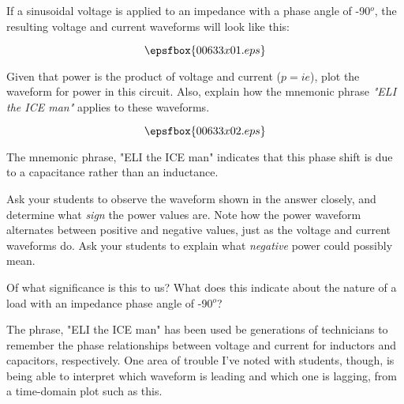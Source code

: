

If a sinusoidal voltage is applied to an impedance with a phase angle of -90$^{o}$, the resulting voltage and current waveforms will look like this:

$$\epsfbox{00633x01.eps}$$

Given that power is the product of voltage and current ($p = i e$), plot the waveform for power in this circuit.  Also, explain how the mnemonic phrase {\it "ELI the ICE man"} applies to these waveforms.







$$\epsfbox{00633x02.eps}$$

The mnemonic phrase, "ELI the ICE man" indicates that this phase shift is due to a capacitance rather than an inductance.







Ask your students to observe the waveform shown in the answer closely, and determine what {\it sign} the power values are.  Note how the power waveform alternates between positive and negative values, just as the voltage and current waveforms do.  Ask your students to explain what {\it negative} power could possibly mean.

Of what significance is this to us?  What does this indicate about the nature of a load with an impedance phase angle of -90$^{o}$?

\vskip 10pt

The phrase, "ELI the ICE man" has been used be generations of technicians to remember the phase relationships between voltage and current for inductors and capacitors, respectively.  One area of trouble I've noted with students, though, is being able to interpret which waveform is leading and which one is lagging, from a time-domain plot such as this.




